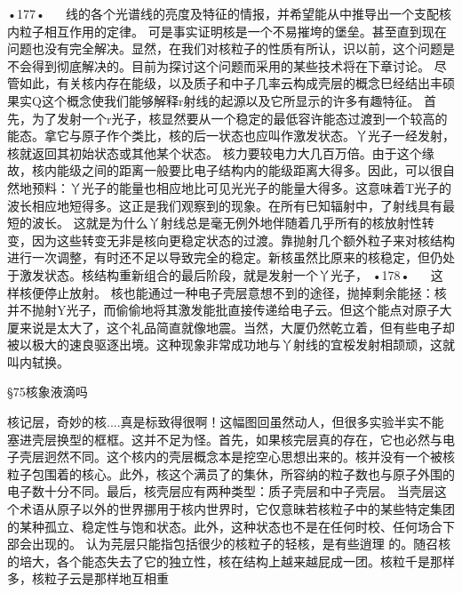 •177•
  
线的各个光谱线的亮度及特征的情报，并希望能从中推导出一个支配核内粒子相互作用的定律。
可是事实证明核是一个不易摧垮的堡垒。甚至直到现在问题也没有完全解决。显然，在我们对核粒子的性质有所认，识以前，这个问题是不会得到彻底解决的。目前为探讨这个问题而采用的某些技术将在下章讨论。
尽管如此，有关核内存在能级，以及质子和中子几率云构成壳层的概念巳经结出丰硕果实Q这个概念使我们能够解释r射线的起源以及它所显示的许多有趣特征。
首先，为了发射一个r光子，核显然要从一个稳定的最低容许能态过渡到一个较高的能态。拿它与原子作个类比，核的后一状态也应叫作激发状态。丫光子一经发射，核就返回其初始状态或其他某个状态。
核力要较电力大几百万倍。由于这个缘故，核内能级之间的距离一般要比电子结构内的能级距离大得多。因此，可以很自然地预料：丫光子的能量也相应地比可见光光子的能量大得多。这意味着T光子的波长相应地短得多。这正是我们观察到的现象。在所有巳知辐射中，了射线具有最短的波长。
这就是为什么丫射线总是毫无例外地伴随着几乎所有的核放射性转变，因为这些转变无非是核向更稳定状态的过渡。靠抛射几个额外粒子来对核结构进行一次调整，有时还不足以导致完全的稳定。新核虽然比原来的核稳定，但仍处于激发状态。核结构重新组合的最后阶段，就是发射一个丫光子，
•178•
  
这样核便停止放射。
核也能通过一种电子壳层意想不到的途径，抛掉剩余能拯：核并不抛射Y光子，而偷偷地将其激发能批直接传递给电子云。但这个能点对原子大厦来说是太大了，这个礼品简直就像地震。当然，大厦仍然乾立着，但有些电子却被以极大的速良驱逐出境。这种现象非常成功地与丫射线的宜桵发射相颉顽，这就叫内轼换。

§75核象液滴吗

核记层，奇妙的核....真是标致得很啊！这幅图回虽然动人，但很多实验半实不能塞进壳层换型的框框。这并不足为怪。首先，如果核完层真的存在，它也必然与电子壳层迥然不同。这个核内的壳层概念本是挖空心思想出来的。核并没有一个被核粒子包围着的核心。此外，核这个满员了的集休，所容纳的粒子数也与原子外围的电子数十分不同。最后，核壳层应有两种类型：质子壳层和中子壳层。
当壳层这个术语从原子以外的世界挪用于核内世界时，它仅意昧若核粒子中的某些特定集团的某种孤立、稳定性与饱和状态。此外，这种状态也不是在任何时校、任何场合下郘会出现的。
认为芫层只能指包括很少的核粒子的轻核，是有些逍理
的。随召核的培大，各个能态失去了它的独立性，核在结构上越来越屁成一团。核粒千是那样多，核粒子云是那样地互相重

